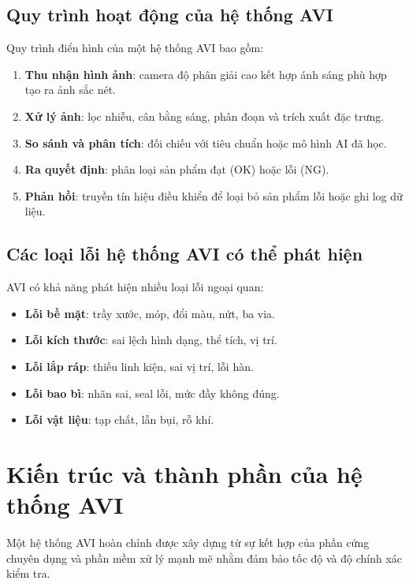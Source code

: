 \subsection*{Quy trình hoạt động của hệ thống AVI}

Quy trình điển hình của một hệ thống AVI bao gồm:

\begin{enumerate}
    \item \textbf{Thu nhận hình ảnh}: camera độ phân giải cao kết hợp ánh sáng phù hợp tạo ra ảnh sắc nét.
    \item \textbf{Xử lý ảnh}: lọc nhiễu, cân bằng sáng, phân đoạn và trích xuất đặc trưng.
    \item \textbf{So sánh và phân tích}: đối chiếu với tiêu chuẩn hoặc mô hình AI đã học.
    \item \textbf{Ra quyết định}: phân loại sản phẩm đạt (OK) hoặc lỗi (NG).
    \item \textbf{Phản hồi}: truyền tín hiệu điều khiển để loại bỏ sản phẩm lỗi hoặc ghi log dữ liệu.
\end{enumerate}

\subsection*{Các loại lỗi hệ thống AVI có thể phát hiện}

AVI có khả năng phát hiện nhiều loại lỗi ngoại quan:

\begin{itemize}
    \item \textbf{Lỗi bề mặt}: trầy xước, móp, đổi màu, nứt, ba via.
    \item \textbf{Lỗi kích thước}: sai lệch hình dạng, thể tích, vị trí.
    \item \textbf{Lỗi lắp ráp}: thiếu linh kiện, sai vị trí, lỗi hàn.
    \item \textbf{Lỗi bao bì}: nhãn sai, seal lỗi, mức đầy không đúng.
    \item \textbf{Lỗi vật liệu}: tạp chất, lẫn bụi, rỗ khí.
\end{itemize}


\section{Kiến trúc và thành phần của hệ thống AVI}

Một hệ thống AVI hoàn chỉnh được xây dựng từ sự kết hợp của phần cứng chuyên dụng và phần mềm xử lý mạnh mẽ nhằm đảm bảo tốc độ và độ chính xác kiểm tra.

